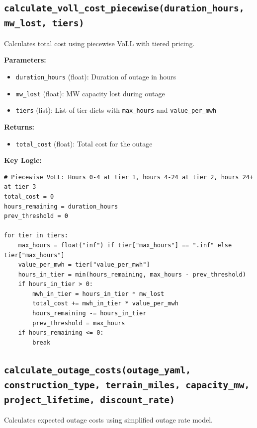 \documentclass[ctcc_full_documentation.tex]{subfiles}
\begin{document}
\subsection{\texttt{calculate\_voll\_cost\_piecewise(duration\_hours, mw\_lost, tiers)}}

Calculates total cost using piecewise VoLL with tiered pricing.

\textbf{Parameters:}
\begin{itemize}
    \item \texttt{duration\_hours} (float): Duration of outage in hours
    \item \texttt{mw\_lost} (float): MW capacity lost during outage
    \item \texttt{tiers} (list): List of tier dicts with \texttt{max\_hours} and \texttt{value\_per\_mwh}
\end{itemize}

\textbf{Returns:}
\begin{itemize}
    \item \texttt{total\_cost} (float): Total cost for the outage
\end{itemize}

\textbf{Key Logic:}
\begin{lstlisting}
# Piecewise VoLL: Hours 0-4 at tier 1, hours 4-24 at tier 2, hours 24+ at tier 3
total_cost = 0
hours_remaining = duration_hours
prev_threshold = 0

for tier in tiers:
    max_hours = float("inf") if tier["max_hours"] == ".inf" else tier["max_hours"]
    value_per_mwh = tier["value_per_mwh"]
    hours_in_tier = min(hours_remaining, max_hours - prev_threshold)
    if hours_in_tier > 0:
        mwh_in_tier = hours_in_tier * mw_lost
        total_cost += mwh_in_tier * value_per_mwh
        hours_remaining -= hours_in_tier
        prev_threshold = max_hours
    if hours_remaining <= 0:
        break
\end{lstlisting}

\subsection{\texttt{calculate\_outage\_costs(outage\_yaml, construction\_type, terrain\_miles, capacity\_mw, project\_lifetime, discount\_rate)}}

Calculates expected outage costs using simplified outage rate model.
\end{document}
